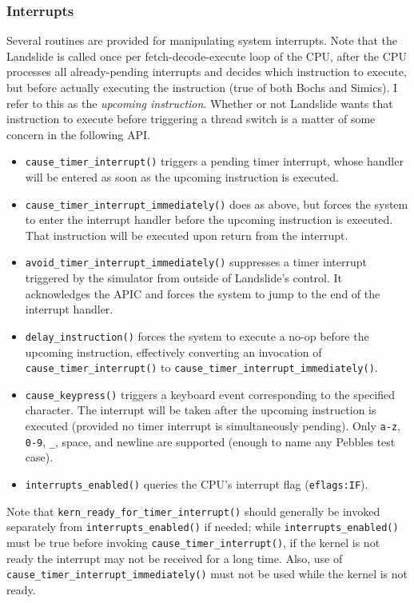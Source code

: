 \subsubsection{Interrupts}
\label{sec:landslide-interrupce}

Several routines are provided for manipulating system interrupts.
Note that the Landslide is called once per fetch-decode-execute loop of the CPU,
after the CPU processes all already-pending interrupts and decides which instruction to execute,
but before actually executing the instruction
(true of both Bochs and Simics).
I refer to this as the {\em upcoming instruction}.
Whether or not Landslide wants that instruction to execute before triggering a thread switch is a matter of some concern in the following API.

\begin{itemize}
	\item {\tt cause\_timer\_interrupt()}
		triggers a pending timer interrupt, whose handler will be entered as soon as the upcoming instruction is executed.
	\item {\tt cause\_timer\_interrupt\_immediately()}
		does as above, but forces the system to enter the interrupt handler before the upcoming instruction is executed.
		That instruction will be executed upon return from the interrupt.
	\item {\tt avoid\_timer\_interrupt\_immediately()}
		suppresses a timer interrupt triggered by the simulator from outside of Landslide's control.
		It acknowledges the APIC and forces the system to jump to the end of the interrupt handler.
	\item {\tt delay\_instruction()}
		forces the system to execute a no-op before the upcoming instruction,
		effectively converting an invocation of {\tt cause\_timer\_interrupt()} to {\tt cause\_timer\_interrupt\_immediately()}.
	\item {\tt cause\_keypress()} triggers a keyboard event corresponding to the specified character.
		The interrupt will be taken after the upcoming instruction is executed
		(provided no timer interrupt is simultaneously pending).
		Only {\tt a-z}, {\tt 0-9}, {\tt \_}, space, and newline are supported (enough to name any Pebbles test case).
	\item {\tt interrupts\_enabled()} queries the CPU's interrupt flag ({\tt eflags:IF}).
\end{itemize}

Note that {\tt kern\_ready\_for\_timer\_interrupt()} should generally be invoked separately
from {\tt interrupts\_enabled()} if needed;
while {\tt interrupts\_enabled()} must be true before invoking {\tt cause\_timer\_interrupt()},
if the kernel is not ready the interrupt may not be received for a long time.
Also, use of {\tt cause\_timer\_interrupt\_immediately()} must not be used while the kernel is not ready.

